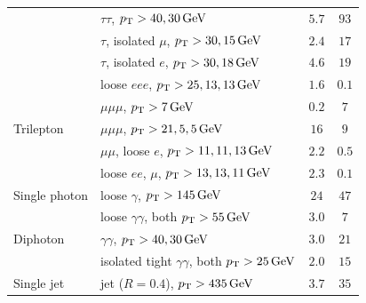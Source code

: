 \begin{table}[tp]
\begin{adjustbox}{width=\textwidth}
\begin{tabular}{llcc}
                               & $\tau\tau$, $\pt > 40, 30\,\eV[G]$                               & $5.7$                         & $93$                          \\
                               & $\tau$, isolated $\mu$, $\pt > 30, 15\,\eV[G]$                   & $2.4$                         & $17$                          \\
                               & $\tau$, isolated $e$, $\pt > 30, 18\,\eV[G]$                     & $4.6$                         & $19$                          \\
\hline
\multirow{5}{*}{Trilepton}     & loose $eee$, $\pt > 25,13,13\,\eV[G]$                            & $1.6$                         & $0.1$                         \\
                               & $\mu\mu\mu$, $\pt > 7\,\eV[G]$                                   & $0.2$                         & $7$                           \\
                               & $\mu\mu\mu$, $\pt > 21,5,5\,\eV[G]$                              & $16$                          & $9$                           \\
                               & $\mu\mu$, loose $e$, $\pt > 11,11,13\,\eV[G]$                    & $2.2$                         & $0.5$                         \\
                               & loose $ee$, $\mu$, $\pt > 13,13,11\,\eV[G]$                      & $2.3$                         & $0.1$                         \\
\hline
Single photon                  & loose $\gamma$, $\pt > 145\,\eV[G]$                              & $24$                          & $47$                          \\
\hline
\multirow{3}{*}{Diphoton}      & loose $\gamma\gamma$, both $\pt > 55\,\eV[G]$                    & $3.0$                         & $7$                           \\
                               & $\gamma\gamma$, $\pt > 40,30\,\eV[G]$                            & $3.0$                         & $21$                          \\
                               & isolated tight $\gamma\gamma$, both $\pt > 25\,\eV[G]$           & $2.0$                         & $15$                          \\
\hline
\multirow{3}{*}{Single jet}    & jet ($R = 0.4$), $\pt > 435\,\eV[G]$                             & $3.7$                         & $35$                          \\

\end{tabular}
\end{adjustbox}
\end{table}
